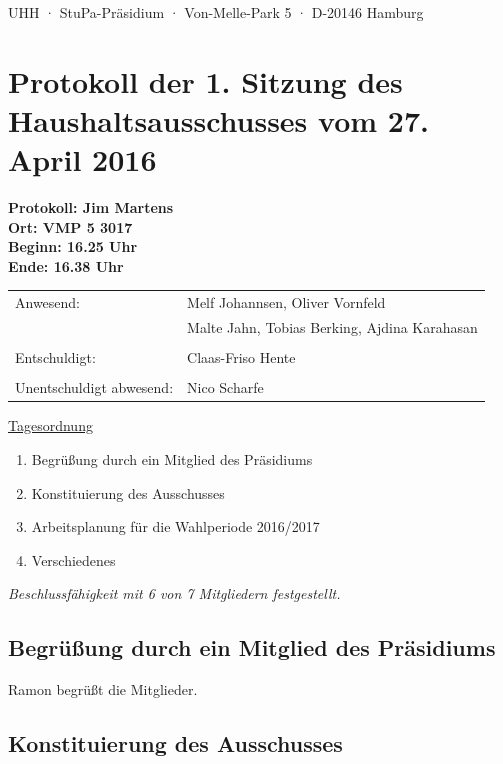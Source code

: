 \documentclass[ngerman,headheight=70pt]{scrartcl}
\begin{document}
    UHH · StuPa-Präsidium · Von-Melle-Park 5 · D-20146 Hamburg

    \section*{Protokoll der 1. Sitzung des Haushaltsausschusses vom 27. April 2016}

    \textbf{Protokoll: Jim Martens}\\
    \textbf{Ort: VMP 5 3017}\\
    \textbf{Beginn: 16.25 Uhr}\\
    \textbf{Ende: 16.38 Uhr}

    \vspace{0.5cm}
    \begin{tabular}{ll}
        Anwesend: & Melf Johannsen, Oliver Vornfeld \\
                  & Malte Jahn, Tobias Berking, Ajdina Karahasan\\
                  & \\
        Entschuldigt: & Claas-Friso Hente \\
                      &\\
        Unentschuldigt abwesend: & Nico Scharfe \\
    \end{tabular}

    \underline{Tagesordnung}
    \begin{enumerate}[label={\textbf{Top \theenumi}},leftmargin=*]
        \item Begrüßung durch ein Mitglied des Präsidiums
        \item Konstituierung des Ausschusses
        \item Arbeitsplanung für die Wahlperiode 2016/2017
        \item Verschiedenes
    \end{enumerate}

    \textit{Beschlussfähigkeit mit 6 von 7 Mitgliedern festgestellt.}

    \subsection{Begrüßung durch ein Mitglied des Präsidiums}

    Ramon begrüßt die Mitglieder.

    \subsection{Konstituierung des Ausschusses}
\end{document}
